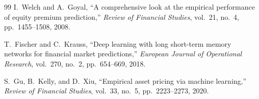 \documentclass[11pt,a4paper]{article}
\begin{document}
\begin{thebibliography}{99}
 I.~Welch and A.~Goyal, ``A comprehensive look at the empirical
performance of equity premium prediction,'' \emph{Review of Financial Studies},
vol.\ 21, no.\ 4, pp.\ 1455--1508, 2008.

 T.~Fischer and C.~Krauss, ``Deep learning with long short-term
memory networks for financial market predictions,'' \emph{European Journal of
Operational Research}, vol.\ 270, no.\ 2, pp.\ 654--669, 2018.

 S.~Gu, B.~Kelly, and D.~Xiu, ``Empirical asset pricing via machine
learning,'' \emph{Review of Financial Studies}, vol.\ 33, no.\ 5, pp.\ 2223--2273,
2020.

\end{thebibliography}
\end{document}
